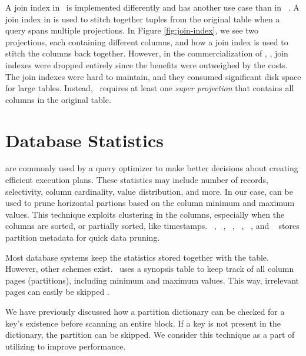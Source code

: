 
A join index in \cstore~is implemented differently and has another use case than in \oracle~\cite{Lamb2012-kg}. A join index in \cstore is used to stitch together tuples from the original table when a query spans multiple projections. In Figure \ref{fig:join-index}, we see two projections, each containing different columns, and how a join index is used to stitch the columns back together. However, in the commercialization of \cstore, \vertica, join indexes were dropped entirely since the benefits were outweighed by the costs. The join indexes were hard to maintain, and they consumed significant disk space for large tables. Instead, \vertica~requires at least one \textit{super projection} that contains all columns in the original table.

\section{Database Statistics}
\label{sec:Database Statistics}
 are commonly used by a query optimizer to make better decisions about creating efficient execution plans. These statistics may include number of records, selectivity, column cardinality, value distribution, and more. In our case,  can be used to prune horizontal partions based on the column minimum and maximum values. This technique exploits clustering in the columns, especially when the columns are sorted, or partially sorted, like timestamps. \oracle~\cite{Lahiri2015-mz}, \ibm~\cite{Raman2013-em}, \vertica~\cite{Lamb2012-kg}, \monetx~\cite{Boncz2005-wj}, \mssql~\cite{Larson2013-mc}, and \exasol~\cite{Exasol2014-xh} stores partition metadata for quick data pruning.

Most database systems keep the statistics stored together with the table. However, other schemes exist. \ibm~uses a synopsis table to keep track of all column pages (partitions), including minimum and maximum values. This way, irrelevant pages can easily be skipped \cite{Raman2013-em}.

We have previously discussed how a partition dictionary can be checked for a key's existence before scanning an entire block. If a key is not present in the dictionary, the partition can be skipped. We consider this technique as a part of utilizing  to improve performance.

